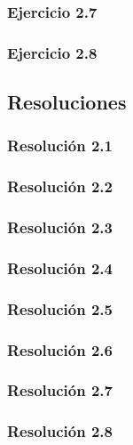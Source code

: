 \subsubsection{Ejercicio 2.7}


\subsubsection{Ejercicio 2.8}


\subsection{Resoluciones}

\subsubsection{Resolución 2.1}


\subsubsection{Resolución 2.2}


\subsubsection{Resolución 2.3}


\subsubsection{Resolución 2.4}


\subsubsection{Resolución 2.5}


\subsubsection{Resolución 2.6}


\subsubsection{Resolución 2.7}


\subsubsection{Resolución 2.8}

